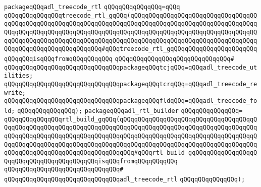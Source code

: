 \newline
\verb|packageqQQqadl_treecode_rtl|\newline
\verb|qQQqqQQqqQQqqQQq=qQQq|\newline
\verb|qQQqqQQqqQQqqQQqtreecode_rtl_gqQQq(qQQqqQQqqQQqqQQqqQQqqQQqqQQqqQQqqQQqqQQqqQQqqQQqqQQqqQQqqQQqqQQqqQQqqQQqqQQqqQQqqQQqqQQqqQQqqQQqqQQqqQQqqQQqqQQqqQQqqQQqqQQqqQQqqQQqqQQqqQQqqQQqqQQqqQQqqQQqqQQqqQQqqQQqqQQqqQQqqQQqqQQqqQQqqQQqqQQqqQQqqQQqqQQqqQQqqQQqqQQqqQQqqQQqqQQqqQQqqQQqqQQqqQQqqQQqqQQqqQQqqQQqqQQqqQQq#qQQqtreecode_rtl_gqQQqqQQqqQQqqQQqqQQqqQQqqQQqqQQqisqQQqfromqQQqqQQqqQQq|\newline
\verb|qQQqqQQqqQQqqQQqqQQqqQQqqQQqqQQq#|\newline
\verb|qQQqqQQqqQQqqQQqqQQqqQQqqQQqqQQqpackageqQQqtcjqQQq=qQQqadl_treecode_utilities;|\newline
\verb|qQQqqQQqqQQqqQQqqQQqqQQqqQQqqQQqpackageqQQqtcrqQQq=qQQqadl_treecode_rewrite;|\newline
\verb|qQQqqQQqqQQqqQQqqQQqqQQqqQQqqQQqpackageqQQqfldqQQq=qQQqadl_treecode_fold;|\newline
\verb|qQQqqQQqqQQqqQQq);|\newline
\newline
\verb|packageqQQqadl_rtl_builder|\newline
\verb|qQQqqQQqqQQqqQQq=|\newline
\verb|qQQqqQQqqQQqqQQqrtl_build_gqQQq(qQQqqQQqqQQqqQQqqQQqqQQqqQQqqQQqqQQqqQQqqQQqqQQqqQQqqQQqqQQqqQQqqQQqqQQqqQQqqQQqqQQqqQQqqQQqqQQqqQQqqQQqqQQqqQQqqQQqqQQqqQQqqQQqqQQqqQQqqQQqqQQqqQQqqQQqqQQqqQQqqQQqqQQqqQQqqQQqqQQqqQQqqQQqqQQqqQQqqQQqqQQqqQQqqQQqqQQqqQQqqQQqqQQqqQQqqQQqqQQqqQQqqQQqqQQqqQQqqQQqqQQqqQQqqQQqqQQqqQQqqQQq#qQQqrtl_build_gqQQqqQQqqQQqqQQqqQQqqQQqqQQqqQQqqQQqqQQqqQQqisqQQqfromqQQqqQQqqQQq|\newline
\verb|qQQqqQQqqQQqqQQqqQQqqQQqqQQqqQQq#|\newline
\verb|qQQqqQQqqQQqqQQqqQQqqQQqqQQqqQQqadl_treecode_rtl|\newline
\verb|qQQqqQQqqQQqqQQq);|\newline
\newline

